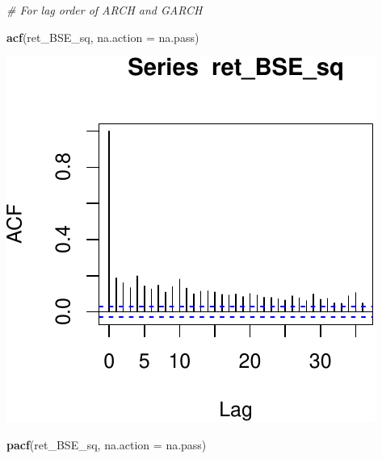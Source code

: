 \documentclass[11pt,]{article}
\newenvironment{Shaded}{\begin{snugshade}}{\end{snugshade}}
\newcommand{\KeywordTok}[1]{\textcolor[rgb]{0.13,0.29,0.53}{\textbf{#1}}}
\newcommand{\DataTypeTok}[1]{\textcolor[rgb]{0.13,0.29,0.53}{#1}}
\newcommand{\CommentTok}[1]{\textcolor[rgb]{0.56,0.35,0.01}{\textit{#1}}}
\newcommand{\NormalTok}[1]{#1}
\begin{document}
\begin{Shaded}
\begin{Highlighting}[]
\CommentTok{# For lag order of ARCH and GARCH}

\KeywordTok{acf}\NormalTok{(ret_BSE_sq, }\DataTypeTok{na.action =}\NormalTok{ na.pass)}
\end{Highlighting}
\end{Shaded}

\begin{center}\includegraphics{FMC_T4_PhD_ARMA_GARCH_files/figure-latex/BSE_fit_ARMA_GARCH-3} \end{center}

\begin{Shaded}
\begin{Highlighting}[]
\KeywordTok{pacf}\NormalTok{(ret_BSE_sq, }\DataTypeTok{na.action =}\NormalTok{ na.pass)}
\end{Highlighting}
\end{Shaded}
\end{document}
